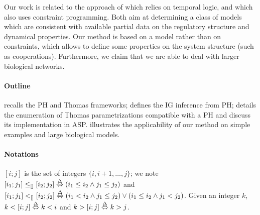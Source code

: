 Our work is related to the approach of \cite{Khalis09} which relies on temporal logic, and \cite{20646302,DBLP:conf/ipcat/CorblinFTCT12} which also uses constraint programming. Both aim at determining a class of models which are consistent with available partial data on the regulatory structure and dynamical properties.
Our method is based on a model rather than on constraints, which allows to define some properties on the system structure (such as cooperations).
Furthermore, we claim that we are able to deal with larger biological networks.

\paragraph{Outline}
 recalls the PH and Thomas frameworks;
 defines the IG inference from PH;
 details the enumeration of Thomas parametrizations compatible with a PH
and discuss its implementation in ASP.
 illustrates the applicability of our method on simple examples
and large biological models.

\paragraph{Notations}
$[i;j]$ is the set of integers $\{ i, i+1, \dots, j \}$;
we note $[i_1;j_1] \leq_{[]} [i_2;j_2] \stackrel{\Delta}\Leftrightarrow (i_1\leq i_2\wedge j_1\leq j_2)$
and $[i_1;j_1] <_{[]} [i_2;j_2] \stackrel{\Delta}\Leftrightarrow 
(i_1<i_2 \wedge j_1\leq j_2) \vee (i_1\leq i_2\wedge j_1 < j_2)$.
Given an integer $k$, $k<[i;j] \stackrel{\Delta}\Leftrightarrow k <i$ and $k>[i;j]\stackrel{\Delta}\Leftrightarrow k > j$.
